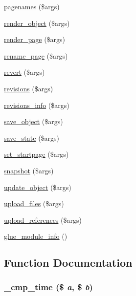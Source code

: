 \begin{CompactItemize}
\item 
\hyperlink{module__glue_8inc_8php_354fc85f928484ae3b316bbf0065d9bd}{pagenames} (\$args)
\item 
\hyperlink{module__glue_8inc_8php_e9103a74e4b40e88536fbc0a52d1c72f}{render\_\-object} (\$args)
\item 
\hyperlink{module__glue_8inc_8php_ab1981a767de519c6c4afb946d748d0a}{render\_\-page} (\$args)
\item 
\hyperlink{module__glue_8inc_8php_cd08b36587528b6f088cafb7d1d6bd29}{rename\_\-page} (\$args)
\item 
\hyperlink{module__glue_8inc_8php_e69e25beb40feedc02d3b850587d20cc}{revert} (\$args)
\item 
\hyperlink{module__glue_8inc_8php_27d90d2ed1b4142554bc4e0e47e9ba0c}{revisions} (\$args)
\item 
\hyperlink{module__glue_8inc_8php_1dc65b69a920ac4ebc8f7c1df305060b}{revisions\_\-info} (\$args)
\item 
\hyperlink{module__glue_8inc_8php_b294f21c7f6fed0932b65167f180c78c}{save\_\-object} (\$args)
\item 
\hyperlink{module__glue_8inc_8php_60d03d7a0d8783e926835f0aa6cff698}{save\_\-state} (\$args)
\item 
\hyperlink{module__glue_8inc_8php_afa7a8fa046ff6119cb7506d68edf787}{set\_\-startpage} (\$args)
\item 
\hyperlink{module__glue_8inc_8php_5d3ad02088eee566589cd47fe0dc889a}{snapshot} (\$args)
\item 
\hyperlink{module__glue_8inc_8php_4aed316adcde13b40c9fc1b35e6537a4}{update\_\-object} (\$args)
\item 
\hyperlink{module__glue_8inc_8php_43746135e67f614d79317029aced064b}{upload\_\-files} (\$args)
\item 
\hyperlink{module__glue_8inc_8php_2099347b9bdf5a5973a13e5f7a4be933}{upload\_\-references} (\$args)
\item 
\hyperlink{module__glue_8inc_8php_9b741f04b878cbc03f1aac7d3406d548}{glue\_\-module\_\-info} ()
\end{CompactItemize}


\subsection{Function Documentation}
\hypertarget{module__glue_8inc_8php_5fea6c120a24a298149febcbf3b1df10}{
\subsubsection[{\_\-cmp\_\-time}]{\setlength{\rightskip}{0pt plus 5cm}\_\-cmp\_\-time (\$ {\em a}, \/  \$ {\em b})}}
\label{module__glue_8inc_8php_5fea6c120a24a298149febcbf3b1df10}


